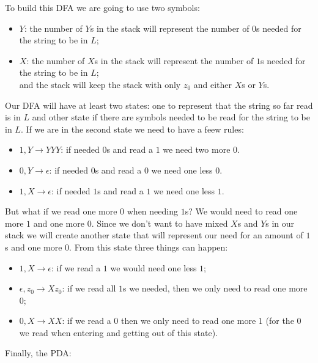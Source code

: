 \documentclass[11pt]{article}
\begin{document}
To build this DFA we are going to use two symbols:
\begin{itemize}
    \item{$Y$:} the number of $Y$s in the stack will represent the number of $0$s needed for the string to be in $L$;
    \item{$X$:} the number of $X$s in the stack will represent the number of $1$s needed for the string to be in $L$; \\
and the stack will keep the stack with only $z_0$ and either $X$s or $Y$s.
\end{itemize}

Our DFA will have at least two states: one to represent that the string so far read is in $L$ and other state if there are symbols needed to be read for the string to be in $L$. If we are in the second state we need to have a feew rules:
\begin{itemize}
\item{$1, Y \rightarrow YYY$:} if needed $0$s and read a $1$ we need two more $0$.
\item{$0, Y \rightarrow \epsilon$:} if needed $0$s and read a $0$ we need one less $0$.
\item{$1, X \rightarrow \epsilon$:} if needed $1$s and read a $1$ we need one less $1$.
\end{itemize}

But what if we read one more $0$ when needing $1$s? We would need to read one more $1$ and one more $0$. Since we don't want to have mixed $X$s and $Y$s in our stack we will create another state that will represent our need for an amount of $1$s and one more $0$. From this state three things can happen:
\begin{itemize}
    \item{$1, X \rightarrow \epsilon$:} if we read a $1$ we would need one less $1$;
    \item{$\epsilon, z_0 \rightarrow Xz_0$:} if we read all $1$s we needed, then we only need to read one more $0$;
    \item{$0, X \rightarrow XX$:} if we read a $0$ then we only need to read one more $1$ (for the $0$ we read when entering and getting out of this state).
\end{itemize}

Finally, the PDA:
\end{document}
